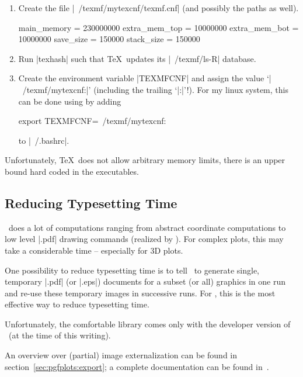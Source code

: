 \begin{enumerate}
	\item Create the file |~/texmf/mytexcnf/texmf.cnf| (and possibly the paths as well).
\begin{codeexample}
main_memory = 230000000 %
extra_mem_top = 10000000     %
extra_mem_bot = 10000000     %
save_size = 150000	%
stack_size = 150000	%

\end{codeexample}
	\item Run |texhash| such that \TeX\ updates its |~/texmf/ls-R| database.
	\item Create the environment variable |TEXMFCNF| and assign the value `|~/texmf/mytexcnf:|' (including the trailing `|:|'!). For my linux system, this can be done using by adding
\begin{codeexample}
export TEXMFCNF=~/texmf/mytexcnf:
\end{codeexample}
	to |~/.bashrc|.
\end{enumerate}

Unfortunately, \TeX\ does not allow arbitrary memory limits, there is an upper bound hard coded in the executables.

\subsection{Reducing Typesetting Time}
\PGFPlots\ does a lot of computations ranging from abstract coordinate computations to low level |.pdf| drawing commands (realized by \PGF). For complex plots, this may take a considerable time -- especially for 3D plots.

One possibility to reduce typesetting time is to tell \PGF\ to generate single, temporary |.pdf| (or |.eps|) documents for a subset (or all) graphics in one run and re-use these temporary images in successive runs. For \PGFPlots, this is the most effective way to reduce typesetting time.

Unfortunately, the comfortable  library comes only with the developer version of \PGF\ (at the time of this writing). 

An overview over (partial) image externalization can be found in section~\ref{sec:pgfplots:export}; a complete documentation can be found in~\cite{tikz}.
